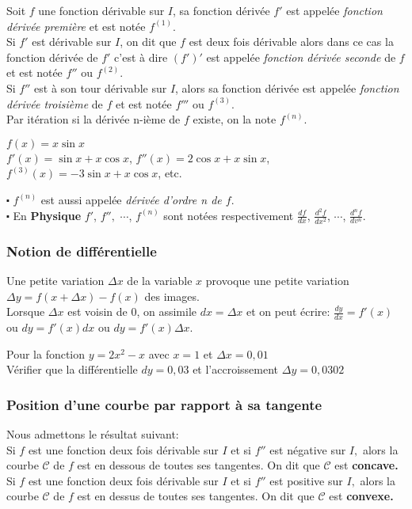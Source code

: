  \begin{definition}
 Soit $ f $ une fonction dérivable sur $ I $, sa fonction  dérivée $ f' $ est appelée                            
  \emph{fonction dérivée première} et est notée $ f^{(1)}.$ \\
 Si $ f'$ est dérivable sur $ I $, on dit que $ f $ est deux fois dérivable alors dans ce cas la fonction  dérivée  de $ f' $ c'est à dire $ (f')' $ est  appelée \emph{fonction dérivée seconde} de $ f $ et est notée $ f'' $ ou $ f^{(2)} .$ \\ 
  Si $ f''$  est à son tour  dérivable sur $ I $, alors sa fonction  dérivée   est  appelée \emph{fonction dérivée troisième} de $ f $ et est notée $ f''' $ ou $ f^{(3)} .$ \\ 
 Par itération si la dérivée n-ième de $ f $ existe, on la note $ f^{(n)} .$   
 \end{definition}
 
  \begin{example}
 $ f(x)= x\sin x $ \\
 $ f'(x)=\sin x+x\cos x $, $ f''(x)=2\cos x+x\sin x $, $ f^{(3)}(x)=-3\sin x+x\cos x $, etc.
  \end{example}
   \begin{remark}
 $ \centerdot $ $ f^{(n)}$ est aussi appelée \emph{dérivée d'ordre n de $ f. $} \\
  $ \centerdot $ En \textbf{\color{magenta}Physique} $f' $, $ f'', $ $\cdots$, $ f^{(n)}$ sont notées respectivement $\frac{df}{dx} $, $ \frac{d^{2}f}{dx^{2}} $, $\cdots$, $ \frac{d^{n}f}{dv^{n}}$.
 \end{remark}
\subsubsection*{Notion de différentielle}
Une petite variation $ \Delta x $ de la variable $ x $ provoque une petite variation  $ \Delta y = f(x+ \Delta x)-f(x) $ des images.\\ Lorsque $ \Delta x $ est voisin de $ 0 $, on assimile $ dx=\Delta x $ et on peut écrire: $ \frac{dy}{dx} =f'(x)$ ou $ dy=f'(x)dx $ ou $ dy=f'(x)\Delta x $.
\begin{example}
 Pour la fonction $ y=2x^2-x $ avec $x=1 $  et $\Delta x= 0,01 $ \\ Vérifier que la différentielle $dy=0,03  $ et l'accroissement $ \Delta y= 0,0302 $
\end{example}
\subsubsection*{Position d'une courbe par rapport à sa tangente}
  Nous admettons le résultat suivant:\\ Si $ f $ est une fonction deux fois dérivable sur $ I $ et si $ f'' $ est négative sur $ I, $ alors la courbe $\mathcal{C} $ de $ f$ est en dessous de toutes ses tangentes. On dit  que  $\mathcal{C} $ est \textbf{\color{magenta} concave.}\\
   Si $ f $ est une fonction deux fois dérivable sur $ I $ et si $ f'' $ est positive sur $ I, $ alors la courbe $\mathcal{C} $ de $ f$ est en dessus de toutes ses tangentes. On dit  que  $\mathcal{C} $ est \textbf{\color{magenta} convexe.}
